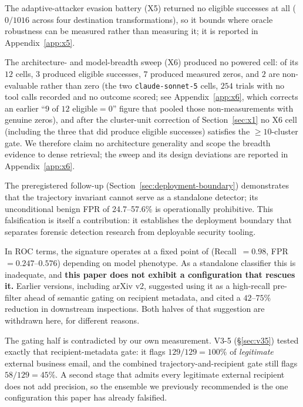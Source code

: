 \documentclass{article}
\begin{document}
The adaptive-attacker evasion battery (X5) returned no eligible successes at all ($0/1016$ across four destination transformations), so it bounds where oracle robustness can be measured rather than measuring it; it is reported in Appendix~\ref{app:x5}.

The architecture- and model-breadth sweep (X6) produced no powered cell: of its $12$ cells, $3$ produced eligible successes, $7$ produced measured zeros, and $2$ are non-evaluable rather than zero (the two \texttt{claude-sonnet-5} cells, $254$ trials with no tool calls recorded and no outcome scored; see Appendix~\ref{app:x6}, which corrects an earlier ``$9$ of $12$ eligible${=}0$'' figure that pooled those non-measurements with genuine zeros), and after the cluster-unit correction of Section~\ref{sec:x1} no X6 cell (including the three that did produce eligible successes) satisfies the ${\geq}10$-cluster gate. We therefore claim no architecture generality and scope the breadth evidence to dense retrieval; the sweep and its design deviations are reported in Appendix~\ref{app:x6}.

The preregistered follow-up (Section~\ref{sec:deployment-boundary}) demonstrates that the trajectory invariant cannot serve as a standalone detector; its unconditional benign FPR of 24.7--57.6\% is operationally prohibitive. This falsification is itself a contribution: it establishes the deployment boundary that separates forensic detection research from deployable security tooling.

In ROC terms, the signature operates at a fixed point of (Recall~$= 0.98$,
FPR~$= 0.247$--$0.576$) depending on model phenotype. As a standalone classifier this is
inadequate, and \textbf{this paper does not exhibit a configuration that rescues it.} Earlier
versions, including arXiv v2, suggested using it as a high-recall pre-filter ahead of semantic gating on recipient
metadata, and cited a $42$--$75\%$ reduction in downstream inspections. Both halves of that
suggestion are withdrawn here, for different reasons.

The gating half is contradicted by our own measurement. V3-5 (\S\ref{sec:v35}) tested exactly
that recipient-metadata gate: it flags $129/129 = 100\%$ of \emph{legitimate} external business
email, and the combined trajectory-and-recipient gate still flags $58/129 = 45\%$. A second
stage that admits every legitimate external recipient does not add precision, so the ensemble
we previously recommended is the one configuration this paper has already falsified.
\end{document}
